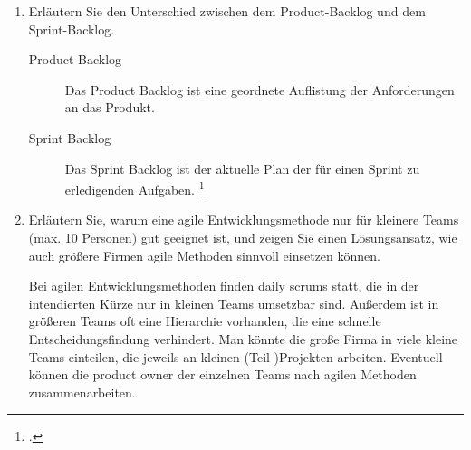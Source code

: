 \documentclass{bschlangaul-aufgabe}
\begin{document}
\begin{enumerate}

\item Erläutern Sie den Unterschied zwischen dem Product-Backlog und dem
Sprint-Backlog.

\begin{bAntwort}
\begin{description}
\item[Product Backlog]

Das Product Backlog ist eine geordnete Auflistung der Anforderungen an
das Produkt.

\item[Sprint Backlog]

Das Sprint Backlog ist der aktuelle Plan der für einen Sprint zu
erledigenden Aufgaben.
\footcite{wiki:scrum}
\end{description}
\end{bAntwort}


\item Erläutern Sie, warum eine agile Entwicklungsmethode nur für
kleinere Teams (max. 10 Personen) gut geeignet ist, und zeigen Sie einen
Lösungsansatz, wie auch größere Firmen agile Methoden sinnvoll einsetzen
können.

\begin{bAntwort}
Bei agilen Entwicklungsmethoden finden daily scrums statt, die in der
intendierten Kürze nur in kleinen Teams umsetzbar sind. Außerdem ist in
größeren Teams oft eine Hierarchie vorhanden, die eine schnelle
Entscheidungsfindung verhindert. Man könnte die große Firma in viele
kleine Teams einteilen, die jeweils an kleinen (Teil-)Projekten
arbeiten. Eventuell können die product owner der einzelnen Teams nach
agilen Methoden zusammenarbeiten.
\end{bAntwort}

\end{enumerate}
\end{document}

